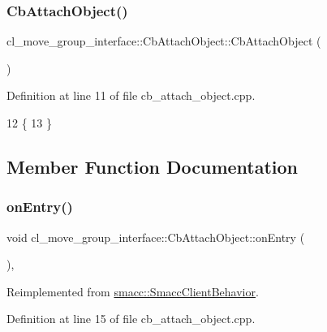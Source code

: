 \subsubsection{\texorpdfstring{Cb\+Attach\+Object()}{CbAttachObject()}\hspace{0.1cm}{\footnotesize\ttfamily [2/2]}}
{\footnotesize\ttfamily cl\+\_\+move\+\_\+group\+\_\+interface\+::\+Cb\+Attach\+Object\+::\+Cb\+Attach\+Object (\begin{DoxyParamCaption}{ }\end{DoxyParamCaption})}



Definition at line 11 of file cb\+\_\+attach\+\_\+object.\+cpp.


\begin{DoxyCode}
12     \{
13         \}
\end{DoxyCode}


\subsection{Member Function Documentation}
\mbox{\label{classcl__move__group__interface_1_1CbAttachObject_a05cd996ea25ee1b2ae74541a5ec56e98}} 
\subsubsection{\texorpdfstring{on\+Entry()}{onEntry()}}
{\footnotesize\ttfamily void cl\+\_\+move\+\_\+group\+\_\+interface\+::\+Cb\+Attach\+Object\+::on\+Entry (\begin{DoxyParamCaption}{ }\end{DoxyParamCaption})\hspace{0.3cm}{\ttfamily [override]}, {\ttfamily [virtual]}}



Reimplemented from \hyperlink{classsmacc_1_1SmaccClientBehavior_ad5d3e1f1697c3cfe66c94cadba948493}{smacc\+::\+Smacc\+Client\+Behavior}.



Definition at line 15 of file cb\+\_\+attach\+\_\+object.\+cpp.



